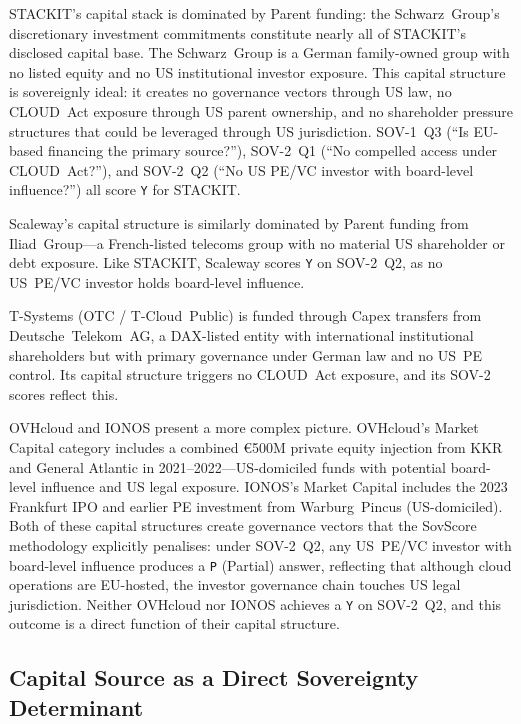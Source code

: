 STACKIT's capital stack is dominated by Parent funding: the Schwarz~Group's discretionary investment commitments constitute nearly all of STACKIT's disclosed capital base. The Schwarz~Group is a German family-owned group with no listed equity and no US institutional investor exposure. This capital structure is sovereignly ideal: it creates no governance vectors through US law, no CLOUD~Act exposure through US parent ownership, and no shareholder pressure structures that could be leveraged through US jurisdiction. SOV-1~Q3 (``Is EU-based financing the primary source?''), SOV-2~Q1 (``No compelled access under CLOUD~Act?''), and SOV-2~Q2 (``No US PE/VC investor with board-level influence?'') all score \texttt{Y} for STACKIT.

Scaleway's capital structure is similarly dominated by Parent funding from Iliad~Group---a French-listed telecoms group with no material US shareholder or debt exposure. Like STACKIT, Scaleway scores \texttt{Y} on SOV-2~Q2, as no US~PE/VC investor holds board-level influence.

T-Systems (OTC / T-Cloud~Public) is funded through Capex transfers from Deutsche~Telekom~AG, a DAX-listed entity with international institutional shareholders but with primary governance under German law and no US~PE control. Its capital structure triggers no CLOUD~Act exposure, and its SOV-2 scores reflect this.

OVHcloud and IONOS present a more complex picture. OVHcloud's Market Capital category includes a combined €500M private equity injection from KKR and General Atlantic in 2021--2022---US-domiciled funds with potential board-level influence and US legal exposure. IONOS's Market Capital includes the 2023 Frankfurt IPO and earlier PE investment from Warburg~Pincus (US-domiciled). Both of these capital structures create governance vectors that the SovScore methodology explicitly penalises: under SOV-2~Q2, any US~PE/VC investor with board-level influence produces a \texttt{P} (Partial) answer, reflecting that although cloud operations are EU-hosted, the investor governance chain touches US legal jurisdiction. Neither OVHcloud nor IONOS achieves a \texttt{Y} on SOV-2~Q2, and this outcome is a direct function of their capital structure.

\subsection{Capital Source as a Direct Sovereignty Determinant}
\label{subsec:capital_sovereignty_link}

